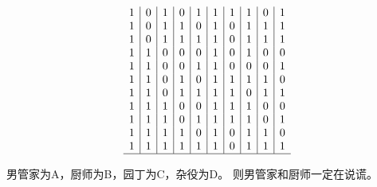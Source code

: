{{\begin{practices}
\begin{table}[H]
\[\begin{array}{c|c|c|c|c|c|c|c|c|c}
                        1 & 0 & 1 & 0 & 1 & 1 & 1 & 1 & 0 & 1 \\
                        1 & 0 & 1 & 1 & 0 & 1 & 0 & 1 & 1 & 1 \\
                        1 & 0 & 1 & 1 & 1 & 1 & 0 & 1 & 1 & 1 \\
                        1 & 1 & 0 & 0 & 0 & 1 & 0 & 1 & 0 & 0 \\
                        1 & 1 & 0 & 0 & 1 & 1 & 0 & 0 & 0 & 1 \\
                        1 & 1 & 0 & 1 & 0 & 1 & 1 & 1 & 1 & 0 \\
                        1 & 1 & 0 & 1 & 1 & 1 & 1 & 0 & 1 & 1 \\
                        1 & 1 & 1 & 0 & 0 & 1 & 1 & 1 & 0 & 0 \\
                        1 & 1 & 1 & 0 & 1 & 1 & 1 & 1 & 0 & 1 \\
                        1 & 1 & 1 & 1 & 0 & 1 & 0 & 1 & 1 & 0 \\
                        1 & 1 & 1 & 1 & 1 & 1 & 0 & 1 & 1 & 1 \\
                        \hline
                   \end{array}
               \]
            \end{table}
        \end{practices}

        \begin{practices}
            男管家为A，厨师为B，园丁为C，杂役为D。
            则男管家和厨师一定在说谎。


\end{practices}}}
